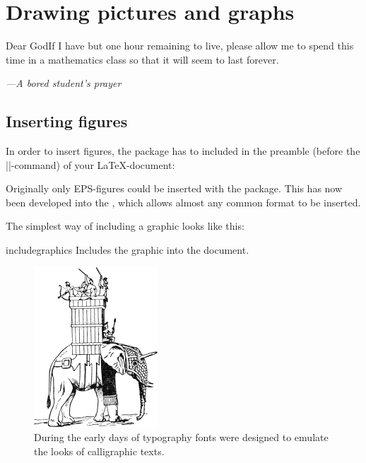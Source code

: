 \newcommand\addcredit[1]{%
 \bgroup
 \vspace*{-6.5pt}
 \scriptsize%
  \tcbox[colframe=white,
        colback=white,
        size=minimal, 
        nobeforeafter,
        minipage,
        boxsep=0pt,
        top=0pt, 
        bottom=0pt,
        shrink tight,
        right=0pt,left=0pt]{\hfill\hfill\textit{Credit: #1}}%
 \egroup
}


\chapter{Drawing pictures and graphs}

\epigraph{Dear God\break If I have but one hour remaining to live, please allow me to spend this time
in a mathematics class so that it will seem to last forever.}{\textit{---A bored student's prayer}}


\section{Inserting figures}

In order to insert figures, the  package has to included in the preamble (before the ||-command) of your LaTeX-document:

\begin{dispListing}
\usepackage{graphicx}
\end{dispListing}

Originally only EPS-figures could be inserted with the package. This has now been developed into the  , which allows almost any common format to be inserted. 

The simplest way of including a graphic looks like this:


\begin{docCommand}{includegraphics}{ }{}
Includes the graphic into the document.
\end{docCommand}

\begin{figure}[htbp]%
  \centering
  \includegraphics[width=0.3\linewidth]{./graphics/pic37.png}
  \caption{During the early days of typography fonts were designed to emulate the looks of calligraphic texts.}
  \label{fig:marginfig1}
\end{figure}

